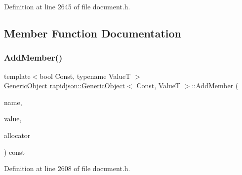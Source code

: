 Definition at line 2645 of file document.\+h.


\begin{DoxyCode}{0}

\end{DoxyCode}


\subsection{Member Function Documentation}
\mbox{\label{classrapidjson_1_1_generic_object_ae811070cbc37cc67bb80a8bdb7d6db14}} 
\subsubsection{\texorpdfstring{AddMember()}{AddMember()}\hspace{0.1cm}{\footnotesize\ttfamily [1/4]}}
{\footnotesize\ttfamily template$<$bool Const, typename ValueT $>$ \\
\mbox{\hyperlink{classrapidjson_1_1_generic_object}{Generic\+Object}} \mbox{\hyperlink{classrapidjson_1_1_generic_object}{rapidjson\+::\+Generic\+Object}}$<$ Const, ValueT $>$\+::Add\+Member (\begin{DoxyParamCaption}\item[{\mbox{\hyperlink{classrapidjson_1_1_generic_object_a282660500748eff5ebab93b88a9d478f}{Value\+Type}} \&}]{name,  }\item[{\mbox{\hyperlink{classrapidjson_1_1_generic_object_a282660500748eff5ebab93b88a9d478f}{Value\+Type}} \&}]{value,  }\item[{\mbox{\hyperlink{classrapidjson_1_1_generic_object_ae30003e248368737382eed69ec8fe1eb}{Allocator\+Type}} \&}]{allocator }\end{DoxyParamCaption}) const}



Definition at line 2608 of file document.\+h.


\begin{DoxyCode}{0}

\end{DoxyCode}



